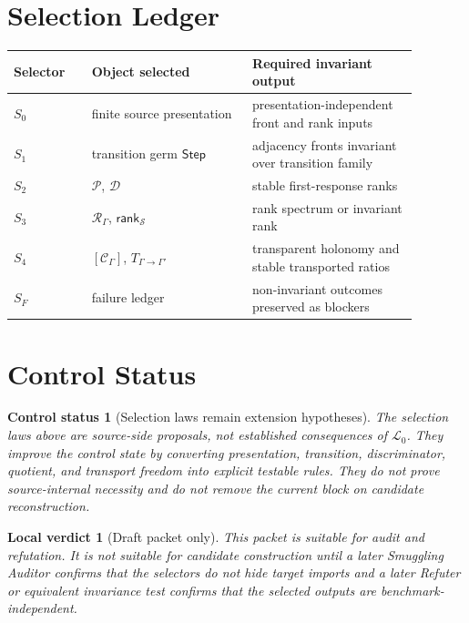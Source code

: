 \documentclass[11pt]{article}
\newcommand{\Step}{\mathsf{Step}}
\newcommand{\RespAlg}{\mathcal{R}_{\Gamma}}
\newcommand{\Rank}{\mathsf{rank}_{\mathcal{S}}}
\newcommand{\Cycle}{\mathcal{C}_{\Gamma}}
\newcommand{\Lang}{\mathcal{L}_{0}}
\newtheorem{status}{Control status}
\newtheorem{verdict}{Local verdict}
\begin{document}
\section{Selection Ledger}

\begin{center}
\begin{tabular}{p{0.17\linewidth}p{0.35\linewidth}p{0.36\linewidth}}
\textbf{Selector} & \textbf{Object selected} & \textbf{Required invariant output} \\
\hline
\(S_0\) & finite source presentation & presentation-independent front and rank inputs \\
\(S_1\) & transition germ \(\Step\) & adjacency fronts invariant over transition family \\
\(S_2\) & \(\mathcal{P}\), \(\mathcal{D}\) & stable first-response ranks \\
\(S_3\) & \(\RespAlg\), \(\Rank\) & rank spectrum or invariant rank \\
\(S_4\) & \([\Cycle]\), \(T_{\Gamma\to\Gamma'}\) & transparent holonomy and stable transported ratios \\
\(S_F\) & failure ledger & non-invariant outcomes preserved as blockers \\
\end{tabular}
\end{center}

\section{Control Status}

\begin{status}[Selection laws remain extension hypotheses]
The selection laws above are source-side proposals, not established
consequences of \(\Lang\). They improve the control state by converting
presentation, transition, discriminator, quotient, and transport freedom into
explicit testable rules. They do not prove source-internal necessity and do
not remove the current block on candidate reconstruction.
\end{status}

\begin{verdict}[Draft packet only]
This packet is suitable for audit and refutation. It is not suitable for
candidate construction until a later Smuggling Auditor confirms that the
selectors do not hide target imports and a later Refuter or equivalent
invariance test confirms that the selected outputs are benchmark-independent.
\end{verdict}
\end{document}
